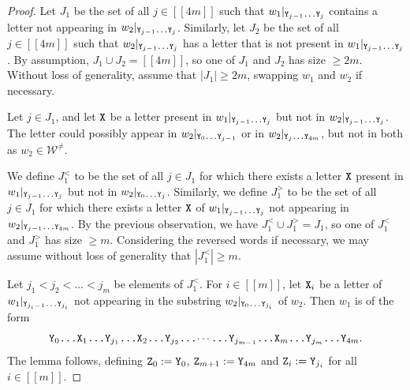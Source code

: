\documentclass[11pt]{amsart}
\theoremstyle{definition}
\renewcommand{\geq}{\geqslant}
\newcommand{\sinterval}[1]{[\![#1]\!] }
\newcommand{\abs}[1]{\left|#1\right|}
\newcommand{\upletters}[1]{{\normalfont{\texttt{#1}}}}
\newcommand{\makesubscript}[1]{\textsubscript{$#1$}}
\newcommand{\word}{\mathcal{W}}
\begin{document}
\begin{proof}
Let $J_1$ be the set of all $j\in \sinterval{4m}$ such that $w_1|_{\upletters{Y\makesubscript{j\!-\!1}\ldots Y\makesubscript{j}}}$ contains a letter not appearing in $w_2|_{\upletters{Y\makesubscript{j\!-\!1}\ldots Y\makesubscript{j}}}$. Similarly, let $J_2$ be the set of all $j\in \sinterval{4m}$ such that $w_2|_{\upletters{Y\makesubscript{j\!-\!1}\ldots Y\makesubscript{j}}}$ has a letter that is not present in $w_1|_{\upletters{Y\makesubscript{j\!-\!1}\ldots Y\makesubscript{j}}}$. By assumption, $J_1 \cup J_2 = \sinterval{4m}$, so one of $J_1$ and $J_2$ has size $\geq 2m$. Without loss of generality, assume that $\abs{J_1} \geq 2m$, swapping $w_1$ and $w_2$ if necessary.

Let $j\in J_1$, and let $\upletters{X}$ be a letter present in $w_1|_{\upletters{Y\makesubscript{j\!-\!1}\ldots Y\makesubscript{j}}}$ but not in $w_2|_{\upletters{Y\makesubscript{j\!-\!1}\ldots Y\makesubscript{j}}}$. The letter \upletters{X} could possibly appear in $w_2|_{\upletters{Y\makesubscript{0}\ldots Y\makesubscript{j\!-\!1}}}$ or in $w_2|_{\upletters{Y\makesubscript{j}\ldots Y\makesubscript{4m}}}$, but not in both as $w_2 \in \word^{\neq}$.

We define $J_1^<$ to be the set of all $j\in J_1$ for which there exists a letter $\upletters{X}$ present in $w_1|_{\upletters{Y\makesubscript{j\!-\!1}\ldots Y\makesubscript{j}}}$ but not in $w_2|_{\upletters{Y\makesubscript{0}\ldots Y\makesubscript{j}}}$. Similarly, we define $J_1^>$ to be the set of all $j\in J_1$ for which there exists a letter $\upletters{X}$ of $w_1|_{\upletters{Y\makesubscript{j\!-\!1}\ldots Y\makesubscript{j}}}$ not appearing in $w_2|_{\upletters{Y\makesubscript{j\!-\!1}\ldots Y\makesubscript{4m}}}$. By the previous observation, we have $J_1^<\cup J_1^> = J_1$, so one of $J_1^<$ and $J_1^>$ has size $\geq m$. Considering the reversed words if necessary, we may assume without loss of generality that $\abs{J_1^<} \geq m$.

Let $j_1<j_2<\ldots<j_m$ be elements of $J_1^<$. For $i\in \sinterval{m}$, let $\upletters{X\makesubscript{i}}$ be a letter of $w_1|_{\upletters{Y\makesubscript{j_i\!-\!1}\ldots Y\makesubscript{j_i}}}$ not appearing in the substring $w_2|_{\upletters{Y\makesubscript{0}\ldots Y\makesubscript{j_i}}}$ of $w_2$. Then $w_1$ is of the form
\begin{equation*}
\upletters{Y\makesubscript{0}\ldots X\makesubscript{1}\ldots Y\makesubscript{j\makesubscript{1}}\ldots X\makesubscript{2}\ldots Y\makesubscript{j\makesubscript{2}}\ldots$\cdots$\ldots Y\makesubscript{j\makesubscript{m\!-\!1}}\ldots X\makesubscript{m}\ldots Y\makesubscript{j\makesubscript{m}}\ldots Y\makesubscript{4m}}.
\end{equation*}
The lemma follows, defining $\upletters{Z\makesubscript{0}} := \upletters{Y\makesubscript{0}}$, $\upletters{Z\makesubscript{m\!+\!1}} := \upletters{Y\makesubscript{4m}}$ and $\upletters{Z\makesubscript{i}} := \upletters{Y\makesubscript{j\makesubscript{i}}}$ for all $i\in \sinterval{m}$.
\end{proof}
\end{document}

